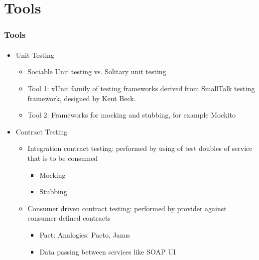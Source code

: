\documentclass{beamer}
\begin{document}
\section{Tools}

\begin{frame}
	\frametitle{Tools}
	\framesubtitle{}
	\begin{itemize}
		\item Unit Testing
			\begin{itemize}
 		 		\item Sociable Unit testing  vs. Solitary unit testing 
		 		\item Tool 1: xUnit family of testing frameworks derived from SmallTalk testing framework, designed by Kent Beck. 
				\item Tool 2: Frameworks for mocking and stubbing, for example Mockito
			\end{itemize}
		\item Contract Testing
			\begin{itemize}
 				\item Integration contract testing: performed by using of test doubles of service that is to be consumed
					\begin{itemize}
						\item Mocking 
						\item Stubbing
					\end{itemize}
				\item Consumer driven contract testing: performed by provider against consumer defined contracts
					\begin{itemize}
						\item Pact: Analogies: Pacto, Janus
						\item Data passing between services like SOAP UI
					\end{itemize}
			\end{itemize}		
	\end{itemize}
\end{frame}
\end{document}
